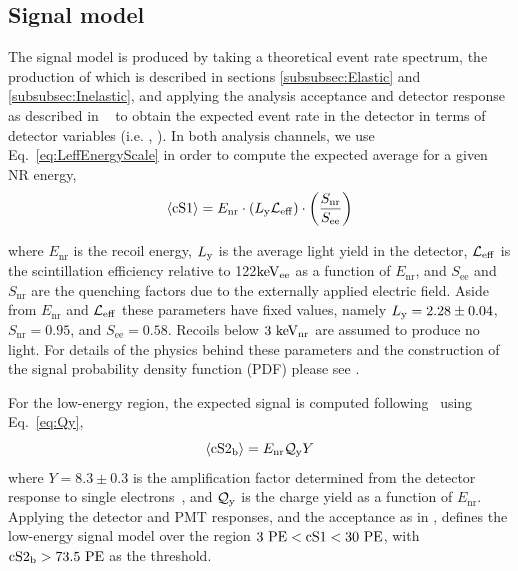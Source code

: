 \subsection{Signal model}
\label{subsec:SignalModel}
The signal model is produced by taking a theoretical event rate spectrum, the production of which is described in sections \ref{subsubsec:Elastic} and \ref{subsubsec:Inelastic}, and applying the analysis acceptance and detector response as described in ~\cite{Aprile:2012vw}  to obtain the expected event rate in the detector in terms of detector variables (i.e. \cSi{}, \cSiib{}). 
In both analysis channels, we use Eq.~\ref{eq:LeffEnergyScale} in order to compute the expected average \cSi{} for a given NR energy,
\begin{equation}
\label{eq:LeffEnergyScale}
	\langle \mathrm{cS1} \rangle = E_{\mathrm{nr}} \cdot (L_{\mathrm{y}} \mathcal{L}_{\mathrm{eff}}) \cdot   \left(\frac{S_\mathrm{nr}}{S_\mathrm{ee}}\right) 
\end{equation}

where $E_\mathrm{nr}$ is the recoil energy, $L_{\mathrm{y}}$ is the average light yield in the detector, $\mathcal{L}_{\mathrm{eff}}$ is the scintillation efficiency relative to 122$\mathrm{keV_\mathrm{ee}}$ as a function of $E_\mathrm{nr}$, and $S_\mathrm{ee}$ and $S_\mathrm{nr}$ are the quenching factors due to the externally applied electric field. Aside from $E_\mathrm{nr}$ and $\mathcal{L}_{\mathrm{eff}}$ these parameters have fixed values, namely $L_{\mathrm{y}} = 2.28 \pm 0.04$, $S_\mathrm{nr} = 0.95$, and $S_\mathrm{ee} = 0.58$. Recoils below $3~\mathrm{keV_\mathrm{nr}}$ are assumed to produce no light. For details of the physics behind these parameters and the construction of the signal probability density function (PDF) please see \cite{Aprile:2012vw,xe100_run_combination}. 

For the low-energy region, the expected \cSiib{} signal is computed following~\cite{DataMCXenon} using Eq.~\ref{eq:Qy},
%
\begin{equation}
\label{eq:Qy}
	\langle \mathrm{cS2}_\mathrm{b} \rangle = E_{\mathrm{nr}}\mathcal{Q}_{\mathrm{y}} Y   
\end{equation}
%
where $Y = 8.3 \pm 0.3$ 
is the amplification factor determined from the detector response to single electrons~\cite{XenonSingleElectron}, and $\mathcal{Q}_{\mathrm{y}}$ is the charge yield as a function of $E_\mathrm{nr}$. Applying the detector and PMT responses, and the acceptance as in \cite{xe100_run_combination}, defines the low-energy signal model over the region $3~\mathrm{PE} < \mathrm{cS1}{} < 30~\mathrm{PE}$, with $\mathrm{cS2}_\mathrm{b}{} > 73.5~\mathrm{PE}$ as the \Sii{} threshold.

